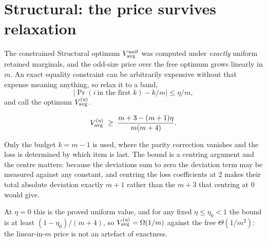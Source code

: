
\section{Structural: the price survives relaxation}
\label{sec:structural}

The constrained Structural optimum $V^{\rm unif}_{\rm avg}$ was computed under
\emph{exactly} uniform retained marginals, and the odd-size price over the free optimum
grows linearly in $m$. An exact equality constraint can be arbitrarily expensive without
that expense meaning anything, so relax it to a band,
\begin{equation}
\bigl|\Pr(i\ \text{in the first }k)-k/m\bigr|\le\eta/m ,
\label{eq:band}
\end{equation}
and call the optimum $V^{(\eta)}_{\rm avg}$.

\begin{theorem}
\label{thm:relaxed}
\begin{equation}
V^{(\eta)}_{\rm avg}\;\ge\;\frac{m+3-(m+1)\eta}{m(m+4)} .
\label{eq:relaxedbound}
\end{equation}
\end{theorem}


Only the budget $k=m-1$ is used, where the parity correction vanishes and the loss is
determined by which item is last. The bound is a centring argument and the centre matters:
because the deviations sum to zero the deviation term may be measured against any constant,
and centring the loss coefficients at $2$ makes their total absolute deviation exactly
$m+1$ rather than the $m+3$ that centring at $0$ would give.

At $\eta=0$ this is the proved uniform value, and for any fixed $\eta\le\eta_{0}<1$ the
bound is at least $(1-\eta_{0})/(m+4)$, so $V^{(\eta)}_{\rm avg}=\Omega(1/m)$ against the
free $\Theta(1/m^{2})$: the linear-in-$m$ price is not an artefact of exactness.

